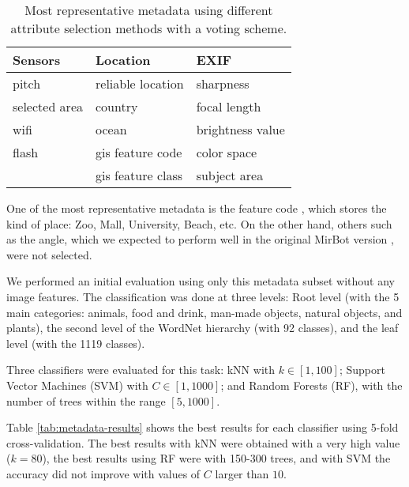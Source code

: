 \documentclass[final, twocolumn]{elsarticle}
\begin{document}
\begin{table}
\centering
\footnotesize
\begin{tabular}{lll}
\hline
\textbf{Sensors} & \textbf{Location}  & \textbf{EXIF}    \\ \hline
pitch           & reliable location  & sharpness        \\
selected area   & country            & focal length     \\
wifi            & ocean              & brightness value \\
flash           & gis feature code   & color space      \\
                & gis feature class  & subject area     \\
\hline
\end{tabular}
\caption{Most representative metadata using different attribute selection methods with a voting scheme.}
\label{tab:metadata-selected}
\end{table}

One of the most representative metadata is the feature code \cite{feat_codes}, which stores the kind of place: Zoo, Mall, University, Beach, etc. On the other hand, others such as the angle, which we expected to perform well in the original MirBot version \cite{MirBot:System}, were not selected.

We performed an initial evaluation using only this metadata subset without any image features. The classification was done at three levels: Root level (with the 5 main categories: animals, food and drink, man-made objects, natural objects, and plants), the second level of the WordNet hierarchy (with 92 classes), and the leaf level (with the 1119 classes). 

Three classifiers were evaluated for this task: kNN with $k \in [1,100]$; Support Vector Machines (SVM) with $C \in [1,1000]$; and Random Forests (RF), with the number of trees within the range $[5,1000]$.  
 
Table \ref{tab:metadata-results} shows the best results for each classifier using 5-fold cross-validation. The best results with kNN were obtained with a very high value ($k=80$), the best results using RF were with 150-300 trees, and with SVM the accuracy did not improve with values of $C$ larger than $10$.
\end{document}
